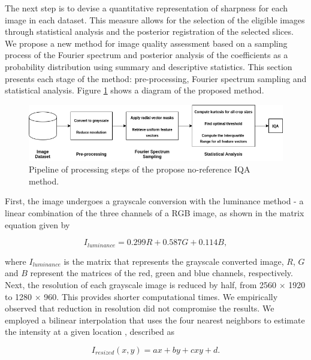 The next step is to devise a quantitative representation of sharpness for each image in each dataset. This measure allows for the selection of the eligible images through statistical analysis and the posterior registration of the selected slices. We propose a new method for image quality assessment based on a sampling process of the Fourier spectrum and posterior analysis of the coefficients as a probability distribution using summary and descriptive statistics. This section presents each stage of the method: pre-processing, Fourier spectrum sampling and statistical analysis. Figure \ref{fig:pipeline} shows a diagram of the proposed method.

\begin{figure}[ht]
  \centering
  \includegraphics[scale=0.6]{images/nr-iqa_pipeline.png}
  \caption{Pipeline of processing steps of the propose no-reference IQA method.}
  \label{fig:pipeline}
\end{figure}

First, the image undergoes a grayscale conversion with the luminance method \cite{ponti2016image} - a 
linear combination of the three channels of a RGB image, as shown in the matrix equation given by

\begin{equation}
    \label{eqn:luminance}
    I_{luminance} = 0.299R + 0.587G + 0.114B,
\end{equation}

\noindent where $I_{luminance}$ is the matrix that represents the grayscale converted image, $R$, $G$ and $B$ represent the matrices of the red, green and blue channels, respectively. Next, the resolution of each grayscale image is reduced by half, from 2560 $\times$ 1920 to 1280 $\times$ 960. This provides shorter computational times. We empirically observed that  reduction in resolution did not compromise the results. We employed a bilinear interpolation that uses the four nearest neighbors to estimate the intensity at a given location \cite{gonzalez2018digital}, described as

\begin{equation}
\label{eqn:bilinear_interpolation}
I_{resized}(x,y) = ax + by + cxy + d.
\end{equation}


